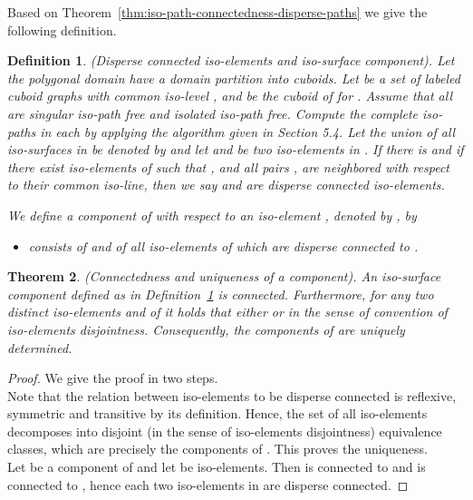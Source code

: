 \documentclass[a4paper,11pt]{article}
\newtheorem{theorem}{Theorem}[section]
\newtheorem{definition}[theorem]{Definition}
\begin{document}
\noindent Based on Theorem~\ref{thm:iso-path-connectedness-disperse-paths} we give the following definition.
\begin{definition}(Disperse connected iso-elements and iso-surface component).
Let the polygonal domain  have a domain partition  into cuboids. Let  be a set of labeled
cuboid graphs with common iso-level , and  be the cuboid of  for .
Assume that all  are singular iso-path free and isolated iso-path free.
Compute the complete iso-paths in each  by applying the algorithm given in Section 5.4.
Let the union of all iso-surfaces in  be denoted by  and let
 and  be two iso-elements in . If there is  and
if there exist iso-elements  of  such that
,  and all pairs ,  are neighbored with respect
to their common iso-line, then we say  and  are disperse connected iso-elements.

We define a component of  with respect to an iso-element , denoted by , by
\begin{itemize}
\item  consists of  and of all iso-elements of  which are disperse connected to .
\end{itemize}
\label{def:component-2}
\end{definition}

\begin{theorem}(Connectedness and uniqueness of a component).
An iso-surface component defined as in Definition~\ref{def:component-2} is connected. Furthermore,
for any two distinct iso-elements  and  of  it holds that either
 or  in the sense of
{\it convention of iso-elements disjointness}. Consequently, the components of  are uniquely
determined.
\label{thm:iso-element-connected}
\end{theorem}
\begin{proof}We give the proof in two steps. \\

Note that the relation between iso-elements to be disperse
connected is reflexive, symmetric and transitive by its definition. Hence, the set of all iso-elements
decomposes into disjoint (in the sense of iso-elements disjointness) equivalence classes, which are
precisely the components of . This proves the uniqueness.\\


Let  be a component of  and let
 be iso-elements. Then  is connected to  and  is connected to ,
hence each two iso-elements in  are disperse connected.
\end{proof}
\end{document}
